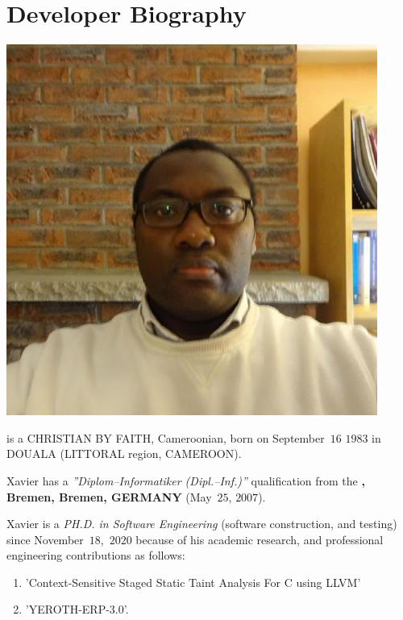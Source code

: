 \section{Developer Biography}\label{chap:biography}
\vspace{-0.9em}

\begin{center}
\includegraphics[scale=0.32]{../../francais/images/XavierNOUNDOU-2}
\end{center}

\textbf{\myfullacademicname} is a CHRISTIAN BY FAITH,
Cameroonian, born on September~$16$ $1983$ in
DOUALA (LITTORAL region, CAMEROON).

Xavier has a \textit{''Diplom--Informatiker (Dipl.--Inf.)''}
qualification from the \textbf{\unibremen, Bremen, Bremen, GERMANY} (May~$25$, $2007$).

Xavier is a \textit{PH.D. in Software Engineering}
(software construction, and testing) since November~$18$,~$2020$
because of his academic research, and professional engineering
contributions as follows:

\begin{enumerate}
	\item 'Context-Sensitive Staged Static Taint Analysis
			For C using LLVM'
	\item 'YEROTH-ERP-3.0'.
\end{enumerate}
